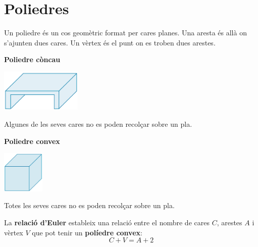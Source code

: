 \pagebreak

\section{ Poliedres }

\begin{theorybox}
 Un poliedre és un cos geomètric format per cares planes. Una aresta és allà on s'ajunten dues cares. Un vèrtex és el punt on es troben dues arestes.

 \begin{multicols}{2}
 	 	\centering
 	 \textbf{Poliedre còncau}
 	
 	\includegraphics[height=2cm]{img-11/poliedro-concavo}
 	
  {\scriptsize	Algunes de les seves cares no es poden recolçar sobre un pla.}
 	
 	\textbf{Poliedre convex}
 		
 	\includegraphics[height=2cm]{img-11/poliedro-convexo}
 	
 	{\scriptsize	Totes les seves cares no es poden recolçar sobre un pla.}
 \end{multicols}
	
 La \textbf{relació d'Euler} estableix una relació entre el nombre de cares ${C}$, arestes $A$ i vèrtex $V$ que pot tenir un \textbf{políedre convex}:	
 \[C+V=A+2\]
 
\end{theorybox}

